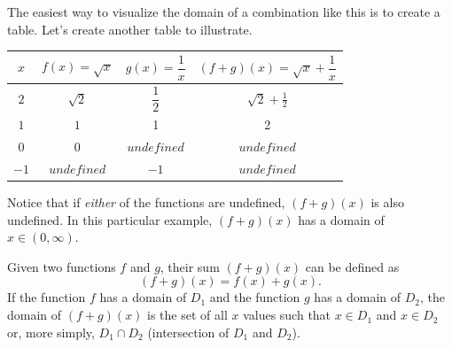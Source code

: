 The easiest way to visualize the domain of a combination like this is to create a table. Let's create another table to illustrate.
\begin{center}
\begin{tabular}{ c | c | c | c}
    $x$ & $f(x) = \sqrt{x}$ & $g(x) = \dfrac{1}{x}$ & $(f + g)(x) = \sqrt{x} + \dfrac{1}{x}$ \\
    \hline
    $2$ & $\sqrt{2}$ & $\dfrac{1}{2}$ & $\sqrt{2} + \frac{1}{2}$ \\
    \hline
    $1$ & $1$ & 1 & 2 \\
    \hline
    $0$ & $0$ & $undefined$ & $undefined$ \\
    \hline
    $-1$ & $undefined$ & $-1$ & $undefined$
\end{tabular}
\end{center}
Notice that if \textit{either} of the functions are undefined, $(f + g)(x)$ is also undefined. In this particular example, $(f + g)(x)$ has a domain of $x \in (0, \infty)$.
\begin{definition}
    Given two functions $f$ and $g$, their sum $(f + g)(x)$ can be defined as 
    \[
        (f + g)(x) = f(x) + g(x) \text{.}
    \]
    If the function $f$ has a domain of $D_1$ and the function $g$ has a domain of $D_2$, the domain of $(f + g)(x)$ is the set of all $x$ values such that $x \in D_1$ and $x \in D_2$ or, more simply, $D_1 \cap D_2$ (intersection of $D_1$ and $D_2$).
\end{definition}